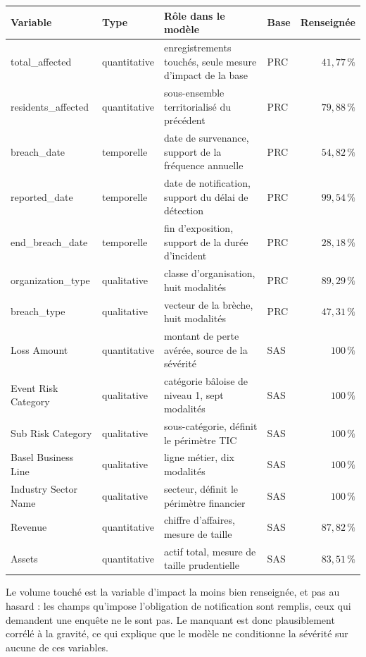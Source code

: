 \begin{center}\footnotesize
\renewcommand{\arraystretch}{1.05}
\begin{tabular}{@{}>{\ttfamily\raggedright}p{3.35cm} l >{\raggedright}p{5.1cm} l r@{}}
\toprule
\textbf{Variable} & \textbf{Type} & \textbf{Rôle dans le modèle} & \textbf{Base} & \textbf{Renseignée} \\
\midrule
total\_affected & quantitative & enregistrements touchés, seule mesure d'impact de la base & PRC & $41{,}77\,\%$ \\
residents\_affected & quantitative & sous-ensemble territorialisé du précédent & PRC & $79{,}88\,\%$ \\
breach\_date & temporelle & date de survenance, support de la fréquence annuelle & PRC & $54{,}82\,\%$ \\
reported\_date & temporelle & date de notification, support du délai de détection & PRC & $99{,}54\,\%$ \\
end\_breach\_date & temporelle & fin d'exposition, support de la durée d'incident & PRC & $28{,}18\,\%$ \\
organization\_type & qualitative & classe d'organisation, huit modalités & PRC & $89{,}29\,\%$ \\
breach\_type & qualitative & vecteur de la brèche, huit modalités & PRC & $47{,}31\,\%$ \\
\midrule
Loss Amount & quantitative & montant de perte avérée, source de la sévérité & SAS & $100\,\%$ \\
Event Risk Category & qualitative & catégorie bâloise de niveau 1, sept modalités & SAS & $100\,\%$ \\
Sub Risk Category & qualitative & sous-catégorie, définit le périmètre TIC & SAS & $100\,\%$ \\
Basel Business Line & qualitative & ligne métier, dix modalités & SAS & $100\,\%$ \\
Industry Sector Name & qualitative & secteur, définit le périmètre financier & SAS & $100\,\%$ \\
Revenue & quantitative & chiffre d'affaires, mesure de taille & SAS & $87{,}82\,\%$ \\
Assets & quantitative & actif total, mesure de taille prudentielle & SAS & $83{,}51\,\%$ \\
\bottomrule
\end{tabular}
\end{center}

Le volume touché est la variable d'impact la moins bien renseignée, et pas au hasard : les champs
qu'impose l'obligation de notification sont remplis, ceux qui demandent une enquête ne le sont pas.
Le manquant est donc plausiblement corrélé à la gravité, ce qui explique que le modèle ne conditionne
la sévérité sur aucune de ces variables.

